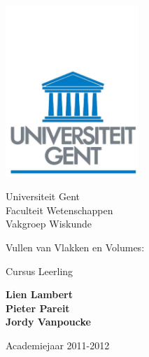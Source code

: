 \documentclass[12pt]{article}
\newif\ifleerkracht
\numberwithin{equation}{section} %
\theoremstyle{plain}  \newtheorem{stel}{Stelling}[section]
\theoremstyle{plain}  \newtheorem{lemma}[stel]{Lemma}
\theoremstyle{plain}  \newtheorem{gevolg}[stel]{Gevolg}
\theoremstyle{definition}  \newtheorem{defi}[stel]{Definitie}
\theoremstyle{definition} \newtheorem{vb}[stel]{Voorbeeld}
\theoremstyle{definition} \newtheorem{vbn}[stel]{Voorbeelden}
\theoremstyle{definition}  \newtheorem{opm}[stel]{Opmerking}
\theoremstyle{plain}  \newtheorem{opdracht}{Opdracht}
\begin{document}
\thispagestyle{empty}

\begin{center}
  \begin{minipage}{7cm}
    \begin{center}

      \includegraphics[width=5cm]{ruglogo.pdf}

      {\large
      Universiteit Gent \\
      Faculteit  Wetenschappen \\
      Vakgroep  Wiskunde
      } 
    \end{center}
  \end{minipage}

  \vspace{3cm}

  {\Huge\bf 

  Vullen van Vlakken en Volumes:\\\vspace*{0.2cm}
  \ifleerkracht
  \Large Cursus Leerkracht
  \else
  \Large Cursus Leerling
  \fi
  }
  
  \baselineskip=12pt
  \vspace{1.5cm}

  {\large\bf  Lien Lambert }\\
  \vspace{0.5cm}
  {\large \bf Pieter Pareit }\\
  \vspace{0.5cm}
  {\large \bf Jordy Vanpoucke}\\

  \baselineskip=12pt

  \vspace{2cm}

  \bigskip

  {\large Academiejaar 2011-2012}

\end{center}
\end{document}
